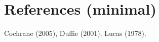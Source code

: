 \documentclass[11pt,letterpaper]{article}
\theoremstyle{plain}
\theoremstyle{definition}
\begin{document}



\section*{References (minimal)}
Cochrane (2005), Duffie (2001), Lucas (1978).
\end{document}
